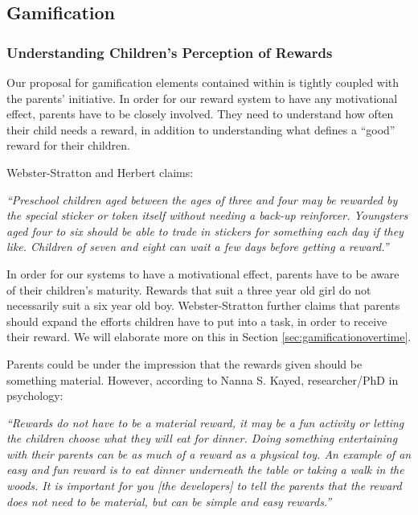\subsection{Gamification}
\label{sec:gamificationresults}

\subsubsection{Understanding Children's Perception of Rewards}
\label{sec:understandingchildrensperceptionofrewards}

Our proposal for gamification elements contained within \app{} is tightly coupled with the parents' initiative. In order for our reward system to have any motivational effect, parents have to be closely involved. They need to understand how often their child needs a reward, in addition to understanding what defines a ``good'' reward for their children. 

Webster-Stratton and Herbert claims:

\textit{``Preschool children aged between the ages of three and four may be rewarded by the special sticker or token itself without needing a back-up reinforcer. Youngsters aged four to six should be able to trade in stickers for something each day if they like. Children of seven and eight can wait a few days before getting a reward.''}\cite{webster1994troubled}

In order for our systems to have a motivational effect, parents have to be aware of their children's maturity. Rewards that suit a three year old girl do not necessarily suit a six year old boy. Webster-Stratton further claims that parents should expand the efforts children have to put into a task, in order to receive their reward. We will elaborate more on this in Section \ref{sec:gamificationovertime}. 

Parents could be under the impression that the rewards given should be something material. However, according to Nanna S. Kayed, researcher/PhD in psychology: 

\textit{``Rewards do not have to be a material reward, it may be a fun activity or letting the children choose what they will eat for dinner. Doing something entertaining with their parents can be as much of a reward as a physical toy. An example of an easy and fun reward is to eat dinner underneath the table or taking a walk in the woods. It is important for you [the developers] to tell the parents that the reward does not need to be material, but can be simple and easy rewards.''}

